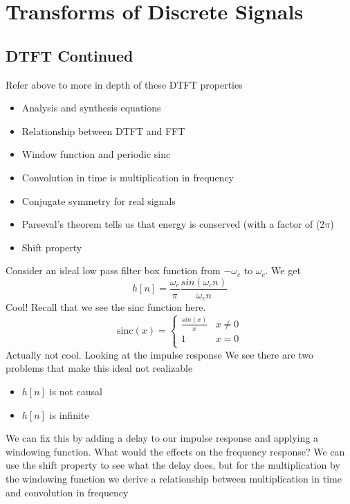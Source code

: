 \documentclass{report}
\begin{document}
\chapter{Transforms of Discrete Signals}
\section{DTFT Continued}
Refer above to more in depth of these DTFT properties
\begin{itemize}
    \item Analysis and synthesis equations
    \item Relationship between DTFT and FFT
    \item Window function and periodic sinc
    \item Convolution in time is multiplication in frequency
    \item Conjugate symmetry for real signals
    \item Parseval's theorem tells us that energy is conserved (with a factor of ($2 \pi$)
    \item Shift property
\end{itemize}

\begin{example}
    Consider an ideal low pass filter box function from $-\omega_c$ to $\omega_c$. 
    We get
    \begin{equation*}
        h[n] = \frac{\omega_c}{\pi} \frac{sin(\omega_c n)}{\omega_c n}
    \end{equation*}
    Cool! Recall that we see the $\mathrm{sinc}$ function here.
    \begin{equation*}
        \mathrm{sinc}(x) = 
        \begin{cases}
            \frac{sin(x)}{x} & x \neq 0 \\
            1 & x = 0 \\
        \end{cases}
    \end{equation*}
    Actually not cool. Looking at the impulse response
    We see there are two problems that make this ideal not realizable
    \begin{itemize}
        \item $h[n]$ is not causal
        \item $h[n]$ is infinite
    \end{itemize}
    We can fix this by adding a delay to our impulse response and applying a windowing function. What would the effects on the frequency response? We can use the shift property to see what the delay does, but for the multiplication by the windowing function we derive a relationship between multiplication in time and convolution in frequency
\end{example}
\end{document}

